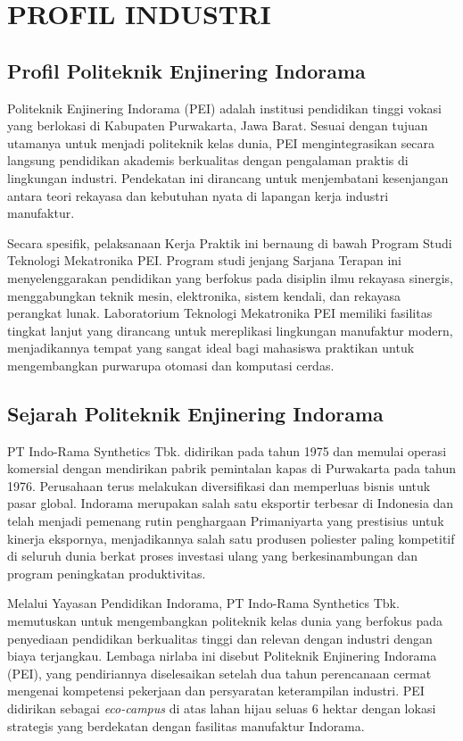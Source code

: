 \chapter{PROFIL INDUSTRI}

\section{Profil Politeknik Enjinering Indorama}
Politeknik Enjinering Indorama (PEI) adalah institusi pendidikan tinggi vokasi yang berlokasi di Kabupaten Purwakarta, Jawa Barat. Sesuai dengan tujuan utamanya untuk menjadi politeknik kelas dunia, PEI mengintegrasikan secara langsung pendidikan akademis berkualitas dengan pengalaman praktis di lingkungan industri. Pendekatan ini dirancang untuk menjembatani kesenjangan antara teori rekayasa dan kebutuhan nyata di lapangan kerja industri manufaktur.

Secara spesifik, pelaksanaan Kerja Praktik ini bernaung di bawah Program Studi Teknologi Mekatronika PEI. Program studi jenjang Sarjana Terapan ini menyelenggarakan pendidikan yang berfokus pada disiplin ilmu rekayasa sinergis, menggabungkan teknik mesin, elektronika, sistem kendali, dan rekayasa perangkat lunak. Laboratorium Teknologi Mekatronika PEI memiliki fasilitas tingkat lanjut yang dirancang untuk mereplikasi lingkungan manufaktur modern, menjadikannya tempat yang sangat ideal bagi mahasiswa praktikan untuk mengembangkan purwarupa otomasi dan komputasi cerdas.

\section{Sejarah Politeknik Enjinering Indorama}
PT Indo-Rama Synthetics Tbk. didirikan pada tahun 1975 dan memulai operasi komersial dengan mendirikan pabrik pemintalan kapas di Purwakarta pada tahun 1976. Perusahaan terus melakukan diversifikasi dan memperluas bisnis untuk pasar global. Indorama merupakan salah satu eksportir terbesar di Indonesia dan telah menjadi pemenang rutin penghargaan Primaniyarta yang prestisius untuk kinerja ekspornya, menjadikannya salah satu produsen poliester paling kompetitif di seluruh dunia berkat proses investasi ulang yang berkesinambungan dan program peningkatan produktivitas.

Melalui Yayasan Pendidikan Indorama, PT Indo-Rama Synthetics Tbk. memutuskan untuk mengembangkan politeknik kelas dunia yang berfokus pada penyediaan pendidikan berkualitas tinggi dan relevan dengan industri dengan biaya terjangkau. Lembaga nirlaba ini disebut Politeknik Enjinering Indorama (PEI), yang pendiriannya diselesaikan setelah dua tahun perencanaan cermat mengenai kompetensi pekerjaan dan persyaratan keterampilan industri. PEI didirikan sebagai \textit{eco-campus} di atas lahan hijau seluas 6 hektar dengan lokasi strategis yang berdekatan dengan fasilitas manufaktur Indorama.

